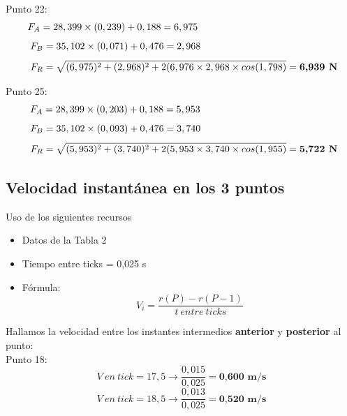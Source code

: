 \documentclass[10pt]{article}
\begin{document}
Punto 22:
 \begin{equation*}
    F_{A} = 28,399 \times (0,239) + 0,188 = 6,975
    \textcolor{Blanco}{-------------..-}
\end{equation*}
\begin{equation*}
    F_{B} = 35,102 \times (0,071) + 0,476 = 2,968
    \textcolor{Blanco}{--------------}
\end{equation*}  
\begin{equation*}
   \textcolor{Blanco}{..} 
    F_{R} = \sqrt{(6,975)^{2} + (2,968)^{2} + 2(6,976 \times 2,968 \times cos(1,798)} = \textbf{6,939 N}
\end{equation*}

Punto 25:
 \begin{equation*}
    F_{A} = 28,399 \times (0,203) + 0,188 = 5,953 \textcolor{Blanco}{--------------}
\end{equation*}
\begin{equation*}
    F_{B} = 35,102 \times (0,093) + 0,476 = 3,740
    \textcolor{Blanco}{--------------}
\end{equation*}  
\begin{equation*}
    \textcolor{Blanco}{..}
    F_{R} = \sqrt{(5,953)^{2} + (3,740)^{2} + 2(5,953 \times 3,740 \times cos(1,955)} = \textbf{5,722 N}
\end{equation*}
\vspace{-3mm}

\subsection{Velocidad instantánea en los 3 puntos}\vspace{2mm}

Uso de los siguientes recursos
\begin{itemize}
    \item Datos de la Tabla 2
    \item Tiempo entre ticks = 0,025 s
    \item Fórmula:
    \large{\begin{equation}
        V_{i} = \frac{r(P) - r(P-1)}{t~entre~ticks}
    \end{equation}}
\end{itemize}

\vspace{0,2cm}
Hallamos la velocidad entre los instantes intermedios \textbf{anterior} y \textbf{posterior} al punto:\\

Punto 18:
 \begin{equation*}
    V~en~tick = 17,5 \longrightarrow \frac{0,015}{0,025} = \textbf{0,600~m/s}
\end{equation*}
\vspace{0,1cm}
 \begin{equation*}
    V~en~tick = 18,5 \longrightarrow \frac{0,013}{0,025} = \textbf{0,520~m/s}
\end{equation*}
\end{document}
